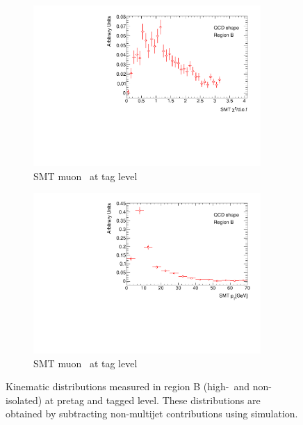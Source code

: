 \begin{figure}[htbp]
    \begin{subfigure}[b]{0.45\textwidth}
      \includegraphics[width=0.95\textwidth]{PartCrossSection/Plots/Electron/h_el_tag_SMT_chi2_wgt.pdf}
      \caption{SMT muon \xsd\ at tag level} \label{fig:CrossRegionBChi2}
    \end{subfigure}
    \;
    \begin{subfigure}[b]{0.45\textwidth}
      \includegraphics[width=0.95\textwidth]{PartCrossSection/Plots/Electron/h_el_tag_SMT_pt_wgt.pdf}
      \caption{SMT muon \pt\ at tag level} \label{fig:CrossRegionBSMTPt}
    \end{subfigure}
    \caption[Kinematic distributions measured in region B (high-\met\ and non-isolated) at pretag and tagged level.]{Kinematic distributions measured in region B (high-\met\ and non-isolated) at pretag and tagged level. These distributions are obtained by subtracting non-multijet contributions using simulation.}
  \label{fig:CrossRegionB}
\end{figure}

